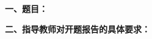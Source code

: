 \thispagestyle{empty}

{
    \setlength{\parindent}{0em}
    \par {\bfseries 一、题目：\uline{\hfill \Title \hfill}}
    \par {\bfseries 二、指导教师对开题报告的具体要求：}
}

\mbox{} \vfill

\signature{指导教师（签名）}
